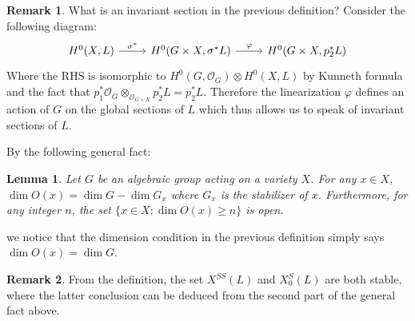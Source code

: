 \documentclass[12pt]{report}
\newtheorem{lemma}{Lemma}[section]
\theoremstyle{remark}
\theoremstyle{definition}
\newtheorem{remark}{Remark}[section]
\newcommand{\s}[0]{\sigma}
\begin{document}
    \begin{remark}
        What is an invariant section in the previous definition? Consider the following diagram:
        \[
            \begin{tikzcd}
                {H^0(X, L)} \arrow[r, "\s^*"] & {H^0(G\times X,\s^* L)} \arrow[r, "\varphi"] & {H^0(G\times X, p_2^*L)}
            \end{tikzcd}
        \]
        Where the RHS is isomorphic to $H^0(G, \mathcal O_G)\otimes H^0(X, L)$ by Kunneth formula and the fact that $p_1^*\mathcal O_G\otimes_{\mathcal O_{G\times X}}p_2^*L=p_2^*L$. Therefore the linearization $\varphi$ defines an action of $G$ on the global sections of $L$ which thus allows us to speak of invariant sections of $L$.
    \end{remark}
    By the following general fact:
    \begin{lemma}
        Let $G$ be an algebraic group acting on a variety $X$. For any $x\in X$, $\dim O(x)=\dim G-\dim G_x$ where $G_x$ is the stabilizer of $x$. Furthermore, for any integer $n$, the set $\{x\in X:\dim O(x)\geqslant n\}$ is open.
    \end{lemma}
    we notice that the dimension condition in the previous definition simply says $\dim O(x)=\dim G$.
    \begin{remark}
        From the definition, the set $X^{SS}(L)$ and $X_0^S(L)$ are both stable, where the latter conclusion can be deduced from the second part of the general fact above.
    \end{remark}
    
\end{document}

